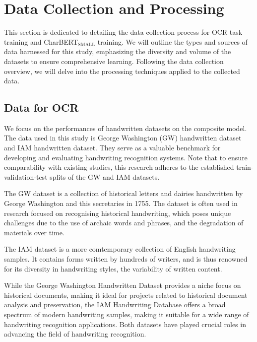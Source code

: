 \label{chap:4_experiment}
\section{Data Collection and Processing}
\label{sec:3_data_collection_and_processing}
This section is dedicated to detailing the data collection process for OCR task training and CharBERT$_{\text{SMALL}}$ training. We will outline the types and sources of data harnessed for this study, emphasizing the diversity and volume of the datasets to ensure comprehensive learning. Following the data collection overview, we will delve into the processing techniques applied to the collected data.
\subsection{Data for OCR} 
\label{subsec:3_data_for_ocr}
We focus on the performances of handwritten datasets on the composite model. The data used in this study is George Washington (GW) handwritten dataset and IAM handwritten dataset. They serve as a valuable benchmark for developing and evaluating handwriting recognition systems. Note that to ensure comparability with existing studies, this research adheres to the established train-validation-test splits of the GW and IAM datasets. 

The GW dataset is a collection of historical letters and dairies handwritten by George Washington and this secretaries in 1755. The dataset is often used in research focused on recognising historical handwriting, which poses unique challenges due to the use of archaic words and phrases, and the degradation of materials over time.

The IAM dataset is a more comtemporary collection of English handwriting samples. It contains forms written by hundreds of writers, and is thus renowned for its diversity in handwriting styles, the variability of written content. 

While the George Washington Handwritten Dataset provides a niche focus on historical documents, making it ideal for projects related to historical document analysis and preservation, the IAM Handwriting Database offers a broad spectrum of modern handwriting samples, making it suitable for a wide range of handwriting recognition applications. Both datasets have played crucial roles in advancing the field of handwriting recognition. 
